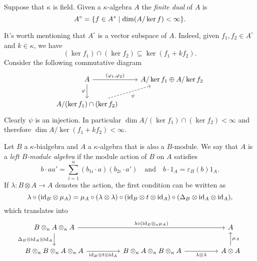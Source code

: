 \begin{defn}
    Suppose that $\kappa$ is field. Given a $\kappa$-algebra $A$ the \textsl{finite dual} of $A$ is
    $$
        A^\circ = \{f\in A^*\mid\dim(A/\ker f)<\infty\}.
    $$
\end{defn}

\begin{rem}
    It's worth mentioning that $A^\circ$ is a vector subspace of $A$. Indeed, given $f_1,f_2\in A^\circ$ and $k\in\kappa$, we have
    $$
        (\ker f_1)\cap(\ker f_2)\subseteq\ker(f_1+kf_2).
    $$
    Consider the following commutative diagram
    $$
    \begin{tikzcd}
        A
                \arrow[d,"\varphi"']
                \arrow[r,"{(\varphi_1,\varphi_2)}"]
            &A/\ker f_1\oplus A/\ker f_2\\
        A/(\ker f_1)\cap(\ker f_2)
            \arrow[ru,"\psi"',dashed]
    \end{tikzcd}
    $$
    Clearly $\psi$ is an injection. In particular $\dim A/(\ker f_1)\cap(\ker f_2)<\infty$ and therefore $\dim A/\ker(f_1+kf_2)<\infty$.
\end{rem}

\begin{defn}\label{defn:b-module-algebra}
    Let $B$ a $\kappa$-bialgebra and $A$ a $\kappa$-algebra that is also a $B$-module. We say that $A$ is a \textsl{left $B$-module algebra} if the module action of $B$ on $A$ satisfies
    $$
        b\cdot aa' = \sum_{i=1}^n(b_{1i}\cdot a)(b_{2i}\cdot a')
        \quad\text{and}\quad
        b\cdot1_A=\varepsilon_B(b)1_A.
    $$
    If $\lambda\colon B\otimes A\to A$ denotes the action, the first condition can be written as
    $$
        \lambda\circ(\text{\rm id}_B\otimes\mu_A)
            =\mu_A\circ(\lambda\otimes\lambda)
                \circ(\text{\rm id}_B\otimes t\otimes\text{\rm id}_A)
                \circ(\Delta_B\otimes\text{\rm id}_A\otimes\text{\rm id}_A),
    $$
    which translates into
    $$
        \begin{tikzcd}[column sep=huge]
            B\otimes_\kappa A\otimes_\kappa A
                    \arrow[rr,"\lambda\circ(\id_B\otimes_\kappa\mu_A)"]
                    \arrow[d,"\Delta_B\otimes\id_A\otimes\id_A"']
                &&A\\
            B\otimes_\kappa B\otimes_\kappa A\otimes_\kappa A
                    \arrow[r,"\id_B\otimes t\otimes\id_A"']
                &B\otimes_\kappa A\otimes_\kappa B\otimes_\kappa A
                    \arrow[r,"\lambda\otimes\lambda"']
                &A\otimes A
                    \arrow[u,"\mu_A"']
        \end{tikzcd}
    $$
\end{defn}


